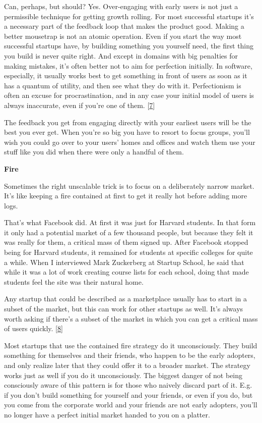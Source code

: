 Can, perhaps, but should? Yes. Over-engaging with early users is not
just a permissible technique for getting growth rolling. For most
successful startups it's a necessary part of the feedback loop that
makes the product good. Making a better mousetrap is not an atomic
operation. Even if you start the way most successful startups have, by
building something you yourself need, the first thing you build is never
quite right. And except in domains with big penalties for making
mistakes, it's often better not to aim for perfection initially. In
software, especially, it usually works best to get something in front of
users as soon as it has a quantum of utility, and then see what they do
with it. Perfectionism is often an excuse for procrastination, and in
any case your initial model of users is always inaccurate, even if
you're one of them. {[}\hyperref[f7n]{7}{]}

The feedback you get from engaging directly with your earliest users
will be the best you ever get. When you're so big you have to resort to
focus groups, you'll wish you could go over to your users' homes and
offices and watch them use your stuff like you did when there were only
a handful of them.

\textbf{Fire}

Sometimes the right unscalable trick is to focus on a deliberately
narrow market. It's like keeping a fire contained at first to get it
really hot before adding more logs.

That's what Facebook did. At first it was just for Harvard students. In
that form it only had a potential market of a few thousand people, but
because they felt it was really for them, a critical mass of them signed
up. After Facebook stopped being for Harvard students, it remained for
students at specific colleges for quite a while. When I interviewed Mark
Zuckerberg at Startup School, he said that while it was a lot of work
creating course lists for each school, doing that made students feel the
site was their natural home.

Any startup that could be described as a marketplace usually has to
start in a subset of the market, but this can work for other startups as
well. It's always worth asking if there's a subset of the market in
which you can get a critical mass of users quickly.
{[}\hyperref[f8n]{8}{]}

Most startups that use the contained fire strategy do it unconsciously.
They build something for themselves and their friends, who happen to be
the early adopters, and only realize later that they could offer it to a
broader market. The strategy works just as well if you do it
unconsciously. The biggest danger of not being consciously aware of this
pattern is for those who naively discard part of it. E.g. if you don't
build something for yourself and your friends, or even if you do, but
you come from the corporate world and your friends are not early
adopters, you'll no longer have a perfect initial market handed to you
on a platter.

